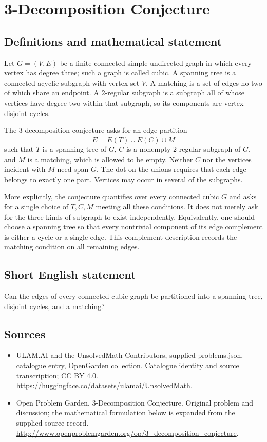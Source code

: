 \documentclass[11pt,a4paper]{article}
\begin{document}
\section*{3-Decomposition Conjecture}\label{statement}

\subsection{Definitions and mathematical statement}
Let $G=(V,E)$ be a finite connected simple undirected graph in which
every vertex has degree three; such a graph is called cubic. A
spanning tree is a connected acyclic subgraph with vertex set $V$.
A matching is a set of edges no two of which share an endpoint. A
$2$-regular subgraph is a subgraph all of whose vertices have degree
two within that subgraph, so its components are vertex-disjoint
cycles.

The $3$-decomposition conjecture asks for an edge partition
\[
 E=E(T)\mathbin{\dot\cup}E(C)\mathbin{\dot\cup}M
\]
such that $T$ is a spanning tree of $G$, $C$ is a nonempty
$2$-regular subgraph of $G$, and $M$ is a matching, which is allowed
to be empty. Neither $C$ nor the vertices incident with $M$ need
span $G$. The dot on the unions requires that each edge belongs to
exactly one part. Vertices may occur in several of the subgraphs.

More explicitly, the conjecture quantifies over every connected
cubic $G$ and asks for a single choice of $T,C,M$ meeting all these
conditions. It does not merely ask for the three kinds of subgraph
to exist independently. Equivalently, one should choose a spanning
tree so that every nontrivial component of its edge complement is
either a cycle or a single edge. This complement description records
the matching condition on all remaining edges.
\subsection{Short English statement}
Can the edges of every connected cubic graph be partitioned into a spanning tree, disjoint cycles, and a matching?
\subsection{Sources}
\begin{itemize}
\item[S1] ULAM.AI and the UnsolvedMath Contributors, supplied problems.json, catalogue entry, OpenGarden collection. Catalogue identity and source transcription; CC BY 4.0.
\url{https://huggingface.co/datasets/ulamai/UnsolvedMath}.
\item[S2] Open Problem Garden, 3-Decomposition Conjecture. Original problem and discussion; the mathematical formulation below is expanded from the supplied source record.
\url{http://www.openproblemgarden.org/op/3_decomposition_conjecture}.
\end{itemize}
\end{document}
